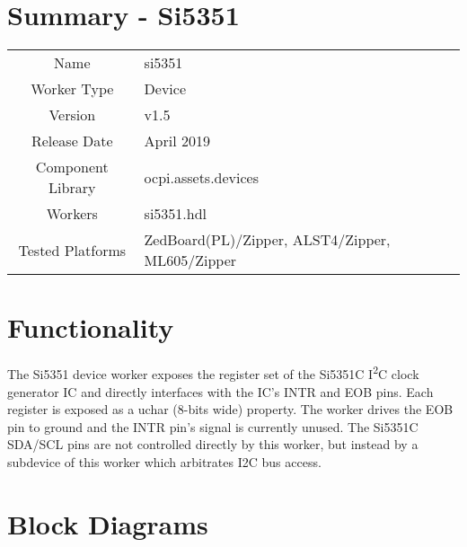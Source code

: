 \documentclass{article}
\author{} %
\date{Version \docVersion} %
\title{\docTitle}
\def\docVersion{1.5}
\def\comp{temp}
\def\comp{si5351}
\def\Comp{TEMP}
\def\Comp{Si5351 }
\begin{document}
\section*{Summary - \Comp}
\begin{tabular}{|c|M{13.5cm}|}
	\hline
	                  &                                                                                \\
	\hline
	Name              & \comp                                                                          \\
	\hline
	Worker Type       & Device                                                                         \\
	\hline
	Version           &  v\docVersion \\
	\hline
	Release Date      &  April 2019 \\
	\hline
	Component Library &  ocpi.assets.devices \\
	\hline
	Workers           &  \comp.hdl \\
	\hline
	Tested Platforms  &  ZedBoard(PL)/Zipper, ALST4/Zipper, ML605/Zipper\\
	\hline
\end{tabular}

\section*{Functionality}
\begin{flushleft}
The \Comp{} device worker exposes the register set of the Si5351C I\textsuperscript{2}C clock generator IC\cite{siliconlabsdatasheet} and directly interfaces with the IC's INTR and EOB pins. Each register is exposed as a uchar (8-bits wide) property. The worker drives the EOB pin to ground and the INTR pin's signal is currently unused. The Si5351C SDA/SCL pins are not controlled directly by this worker, but instead by a subdevice of this worker which arbitrates I2C bus access. \\
\end{flushleft}

\section*{Block Diagrams}
\end{document}
